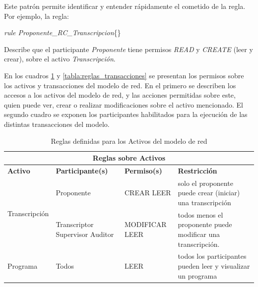 Este patrón permite identificar y entender rápidamente el cometido de la regla. Por ejemplo, la regla:

\centerline{ \textit{rule Proponente\_RC\_Transcripcion}\{\} }   

Describe que el  participante  \textit{Proponente} tiene permisos  \textit{READ} y \textit{CREATE} (leer y crear), sobre el activo \textit{Transcripción}. 

En  los cuadros \ref{tabla:reglas_activos} y \ref{tabla:reglas_transacciones} se presentan los permisos sobre los activos y transacciones del modelo de red. En el primero se describen los accesos a los activos del modelo de red, y las acciones permitidas sobre este, quien puede ver, crear o realizar modificaciones sobre el activo mencionado. El segundo cuadro se exponen los participantes habilitados para la ejecución de las distintas transacciones del modelo.
 
\begin{table}[H]
    \centering
    \caption{Reglas definidas para los Activos del modelo de red}
    \begin{tabular}{|m{6em}|m{6em}|m{6em}|m{14em}|}
        \hline
            \multicolumn{4}{|c|}{Reglas sobre Activos}\\
        \hline
            \textbf{Activo} & \textbf{Participante(s)} & \textbf{Permiso(s)} & \textbf{Restricción}  \\
        \hline
            \multirow{2}{10em}{Transcripción} & Proponente & CREAR LEER & solo el proponente puede crear (iniciar) una transcripción \\
            & Transcriptor Supervisor Auditor & MODIFICAR LEER & todos menos el proponente puede modificar una transcripción.\\
        \hline
            Programa & Todos & LEER & todos los participantes pueden leer y visualizar un programa\\
        \hline
    \end{tabular}
    \label{tabla:reglas_activos}
\end{table}

